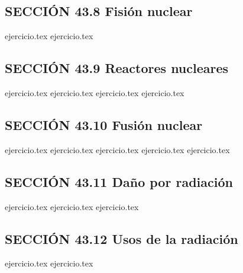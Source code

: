 \subsection*{SECCIÓN 43.8 Fisión nuclear}
\begin{enumerate}
    \setcounter{enumi}{27}
    {ejercicio.tex}
    {ejercicio.tex}
\end{enumerate}

\subsection*{SECCIÓN 43.9 Reactores nucleares}
\begin{enumerate}
    \setcounter{enumi}{29}
    {ejercicio.tex}
    {ejercicio.tex}
    {ejercicio.tex}
    {ejercicio.tex}
\end{enumerate}

\subsection*{SECCIÓN 43.10 Fusión nuclear}
\begin{enumerate}
    \setcounter{enumi}{33}
    {ejercicio.tex}
    {ejercicio.tex}
    {ejercicio.tex}
    {ejercicio.tex}
    {ejercicio.tex}
\end{enumerate}

\subsection*{SECCIÓN 43.11 Daño por radiación}
\begin{enumerate}
    \setcounter{enumi}{38}
    {ejercicio.tex}
    {ejercicio.tex}
    {ejercicio.tex}
\end{enumerate}

\subsection*{SECCIÓN 43.12 Usos de la radiación}
\begin{enumerate}
    \setcounter{enumi}{41}
    {ejercicio.tex}
    {ejercicio.tex}
\end{enumerate}

